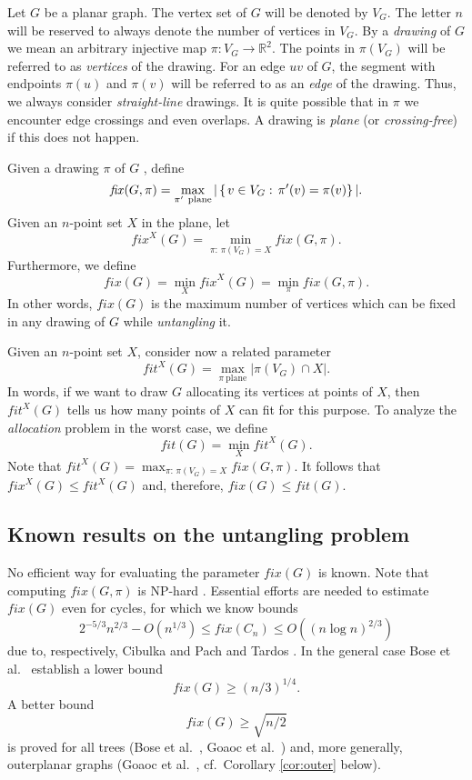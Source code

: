 \documentclass[reqno,12pt]{amsart}
\newcommand{\fix}[1]{\mathit{fix}(#1)}
\newcommand{\fit}[1]{\mathit{fit}(#1)}
\newcommand{\fixx}[1]{\mathit{fix}^X(#1)}
\newcommand{\fitx}[1]{\mathit{fit}^X(#1)}
\newcommand{\reals}{\mathbb{R}}
\newcommand{\function}[2]{:#1 \rightarrow #2}
\newcommand{\setdef}[2]{\left\{ \hspace{0.5mm} #1 : \hspace{0.5mm} #2 \right\}}
\begin{document}
Let $G$ be a planar graph. The vertex set of $G$ will be denoted by $V_G$.
The letter $n$ will be reserved to always denote the number of vertices in $V_G$.
By a \emph{drawing} of $G$ we mean an arbitrary injective map
$\pi\function{V_G}{\reals^2}$.
The points in $\pi(V_G)$ will be referred to as \emph{vertices} of the drawing.
For an edge $uv$ of $G$,
the segment with endpoints $\pi(u)$ and $\pi(v)$ will be referred to as an \emph{edge}
of the drawing. Thus, we always consider \emph{straight-line} drawings.
It is quite possible that in $\pi$ we encounter edge crossings and even overlaps.
A drawing is \emph{plane} (or \emph{crossing-free}) if this does not happen.


Given a drawing $\pi$ of $G$ , define
$$
\fix{G,\pi}=\max_{\pi'\mathrm{\ plane}}|\setdef{v\in V_G}{\pi'(v)=\pi(v)}|.
$$
Given an $n$-point set $X$ in the plane, let
$$
\fixx G=\min_{\pi:\,\pi(V_G)=X}{\fix{G,\pi}}.
$$
Furthermore, we define
\begin{equation}\label{eq:deffix}
\fix G=\min_X\fixx G=\min_\pi\fix{G,\pi}.
\end{equation}
In other words, $\fix G$ is the maximum number of vertices
which can be fixed in any drawing of $G$ while \emph{untangling} it.

Given an $n$-point set $X$, consider now a related parameter
$$
\fitx G=\max_{\pi\mathrm{\ plane}}|\pi(V_G)\cap X|.
$$
In words, if we want to draw $G$ allocating its vertices at points of $X$, then
$\fitx G$ tells us how many points of $X$ can fit for this purpose.
To analyze the \emph{allocation} problem in the worst case, we define
$$
\fit G=\min_X\fitx G.
$$
Note that $\fitx G=\max_{\pi:\,\pi(V_G)=X}{\fix{G,\pi}}$.
It follows that $\fixx G\le\fitx G$ and, therefore,
$\fix G\le\fit G$.


\subsection{Known results on the untangling problem}

No efficient way for evaluating the parameter $\fix G$ is known.
Note that computing $\fix{G,\pi}$ is NP-hard \cite{merged,Ver}.
Essential efforts are needed to estimate $\fix G$ even for cycles, for which
we know bounds
$$
2^{-5/3}n^{2/3}-O(n^{1/3})\le\fix{C_n}\le O((n\log n)^{2/3})
$$
due to, respectively, Cibulka \cite{Cib} and Pach and Tardos \cite{PTa}.
In the general case Bose et al.~\cite{Bose} establish a lower bound
\begin{equation}\label{eq:bose}
\fix G\ge(n/3)^{1/4}.
\end{equation}
A better bound
\begin{equation}\label{eq:n2}
\fix G\ge\sqrt{n/2}
\end{equation} 
is proved for all trees (Bose et al.~\cite{Bose}, Goaoc et al.~\cite{merged}) 
and, more generally, outerplanar graphs (Goaoc et al.~\cite{merged}, cf.\ Corollary \ref{cor:outer} below). 
\end{document}
